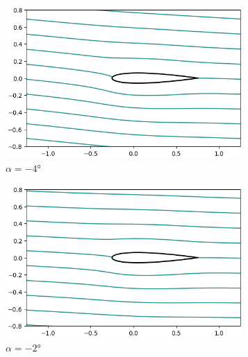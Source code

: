 \documentclass[letterpaper, openright, 12pt]{book}
\begin{document}
    \begin{figure}[htbp!]
        \centering
        \begin{subfigure}[c]{0.48\textwidth}
            \includegraphics[keepaspectratio, width=0.99\textwidth]
                {./img/potential_flow_stream_-4}
            \caption{$\alpha = -4\si{\degree}$}
            \label{fig:potential_flow_cp-4}
        \end{subfigure}
        \hfill
        \begin{subfigure}[c]{0.48\textwidth}
            \includegraphics[keepaspectratio, width=0.99\textwidth]
                {./img/potential_flow_stream_-2}
            \caption{$\alpha = -2\si{\degree}$}
            \label{fig:potential_flow_stream_-2}
        \end{subfigure}
        \begin{subfigure}[c]{0.48\textwidth}

\end{subfigure}
\end{figure}
\end{document}
